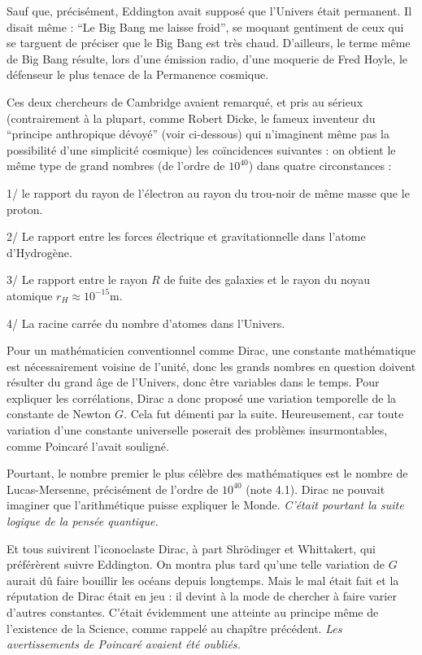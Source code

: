 \documentclass[a4paper,12pt]{article}
\begin{document}
Sauf que, précisément, Eddington avait supposé que l'Univers était permanent. Il disait même : ``Le Big Bang me laisse froid'', se moquant gentiment de ceux qui se targuent de préciser que le Big Bang est très chaud. D'ailleurs, le terme même de Big Bang résulte, lors d'une émission radio, d'une moquerie de Fred Hoyle, le défenseur le plus tenace de la Permanence cosmique.

     Ces deux chercheurs de Cambridge avaient remarqué, et pris au sérieux (contrairement à la plupart, comme Robert Dicke, le fameux inventeur du ``principe anthropique dévoyé'' (voir ci-dessous) qui n'imaginent même pas la possibilité d'une simplicité cosmique) les coïncidences suivantes : on obtient le même type de grand nombres (de l'ordre de $10^40$) dans quatre circonstances :

1/ le rapport du rayon de l'électron au rayon du trou-noir de même masse que le proton.

2/ Le rapport entre les forces électrique et gravitationnelle dans l'atome d'Hydrogène.

3/ Le rapport entre le rayon $R$ de fuite des galaxies et le rayon du noyau atomique $r_H \approx 10^{-15}$m.

4/ La racine carrée du nombre d'atomes dans l'Univers.


Pour un mathématicien conventionnel comme Dirac, une constante mathématique est nécessairement voisine de l'unité, donc les grands nombres en question doivent résulter du grand âge de l'Univers, donc être variables dans le temps. Pour expliquer les corrélations, Dirac a donc proposé une variation temporelle de la constante de Newton $G$. Cela fut démenti par la suite. Heureusement, car toute variation d'une constante universelle poserait des problèmes insurmontables, comme Poincaré l'avait souligné. 

Pourtant, le nombre premier le plus célèbre des mathématiques est le nombre de Lucas-Mersenne, précisément de l'ordre de $10^{40}$ (note 4.1). Dirac ne pouvait imaginer que l'arithmétique puisse expliquer le Monde.\textit{ C'était pourtant la suite logique de la pensée quantique.}

Et tous suivirent l'iconoclaste Dirac, à part Shrödinger et Whittakert, qui préférèrent suivre Eddington. On montra plus tard qu'une telle variation de $G$ aurait dû faire bouillir les océans depuis longtemps. Mais le mal était fait et la réputation de Dirac était en jeu : il devint à la mode de chercher à faire varier d'autres constantes. C'était évidemment une atteinte au principe même de l'existence de la Science, comme rappelé au chapître précédent. \textit{Les avertissements de Poincaré avaient été oubliés.}
     
\end{document}
